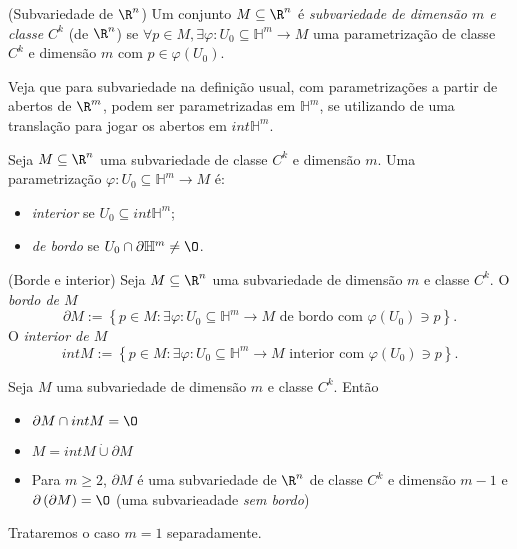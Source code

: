 \begin{definition}
    (Subvariedade de $\R^{n}$) Um conjunto $M\subseteq\R^{n}$ é \emph{subvariedade de dimensão $m$ e classe $C^{k}$} (de $\R^{n}$) se $\forall p\in M, \exists \varphi : U_0\subseteq\mathbb{H}^{m} \longrightarrow M$ uma parametrização de classe $C^{k}$ e dimensão $m$ com $p\in \varphi \left( U_0 \right) $.
\end{definition}

Veja que para subvariedade na definição usual, com parametrizações a partir de abertos de $\R^{m}$, podem ser parametrizadas em $\mathbb{H}^{m}$, se utilizando de uma translação para jogar os abertos em $int \mathbb{H}^{m}$.

\begin{definition}
    Seja $M\subseteq\R^{n}$ uma subvariedade de classe $C^{k}$ e dimensão $m$. Uma parametrização $\varphi : U_0\subseteq\mathbb{H}^{m} \longrightarrow M$ é:
    \begin{itemize}
        \item \emph{interior} se $U_0 \subseteq int \mathbb{H}^{m}$;
	\item \emph{de bordo} se $U_0\cap \partial \mathbb{H}^{m}\neq \O$.
    \end{itemize}
\end{definition}

\begin{definition}
    (Borde e interior) Seja $M\subseteq\R^{n}$ uma subvariedade de dimensão $m$ e classe $C^{k}$. O \emph{bordo de $M$} \[
    \partial M := \left\{ p\in M: \exists \varphi : U_0\subseteq\mathbb{H}^{m} \longrightarrow M \text{ de bordo com }\varphi \left( U_0 \right) \ni p \right\} 
    .\] O \emph{interior de $M$} \[
    int M := \left\{ p \in M : \exists \varphi : U_0\subseteq\mathbb{H}^{m} \longrightarrow M \text{ interior com } \varphi \left( U_0 \right) \ni p\right\} 
    .\] 
\end{definition}

\begin{theorem}
    Seja $M$ uma subvariedade de dimensão $m$ e classe $C^{k}$. Então
    \begin{itemize}
        \item $\partial M \cap int M = \O$
	\item $M = int M \dot{\cup } \partial M$
	\item Para $m\ge 2$, $\partial M$ é uma subvariedade de $\R^{n}$ de classe $C^{k}$ e dimensão $m-1$ e $\partial \left( \partial M \right) = \O$ (uma subvarieadade \emph{sem bordo})
    \end{itemize}
\end{theorem}

Trataremos o caso $m=1$ separadamente.

